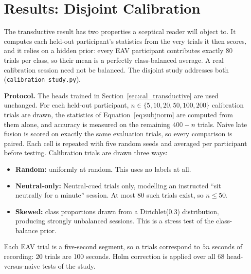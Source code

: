 \section{Results: Disjoint Calibration}
\label{sec:cal_disjoint}

The transductive result has two properties a sceptical reader will object to. It
computes each held-out participant's statistics from the very trials it then scores,
and it relies on a hidden prior: every EAV participant contributes exactly 80 trials
per class, so their mean is a perfectly class-balanced average. A real calibration
session need not be balanced. The disjoint study addresses both
(\texttt{calibration\_study.py}).

\textbf{Protocol.} The heads trained in Section~\ref{sec:cal_transductive} are used
unchanged. For each held-out participant, $n \in \{5, 10, 20, 50, 100, 200\}$
calibration trials are drawn, the statistics of Equation~\ref{eq:subjnorm} are
computed from them alone, and accuracy is measured on the remaining $400-n$ trials.
Naive late fusion is scored on exactly the same evaluation trials, so every
comparison is paired. Each cell is repeated with five random seeds and averaged per
participant before testing. Calibration trials are drawn three ways:
\begin{itemize}
  \item \textbf{Random:} uniformly at random. This uses no labels at all.
  \item \textbf{Neutral-only:} Neutral-cued trials only, modelling an instructed
  ``sit neutrally for a minute'' session. At most 80 such trials exist, so $n \le 50$.
  \item \textbf{Skewed:} class proportions drawn from a Dirichlet(0.3) distribution,
  producing strongly unbalanced sessions. This is a stress test of the class-balance
  prior.
\end{itemize}
Each EAV trial is a five-second segment, so $n$ trials correspond to $5n$ seconds of
recording: 20 trials are 100 seconds. Holm correction is applied over all 68
head-versus-naive tests of the study.

